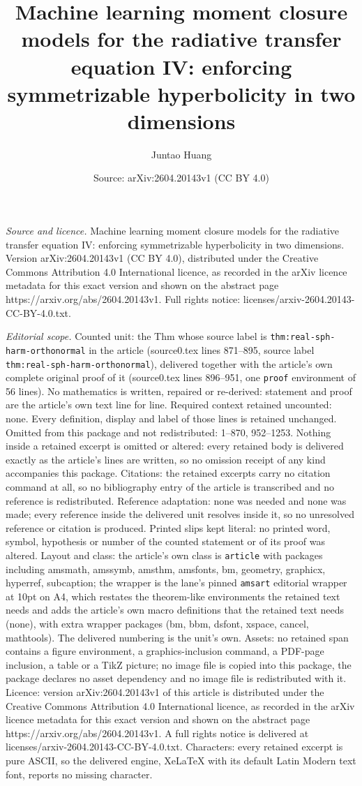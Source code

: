 \documentclass[10pt,a4paper]{amsart}
\title[Machine learning moment closure models for the radiative tra]{Machine learning moment closure models for the radiative transfer equation IV: enforcing symmetrizable hyperbolicity in two dimensions}
\author{Juntao Huang}
\date{Source: arXiv:2604.20143v1 (CC BY 4.0)}
\begin{document}
\maketitle

\noindent\emph{Source and licence.} Machine learning moment closure models for the radiative transfer equation IV: enforcing symmetrizable hyperbolicity in two dimensions. Version arXiv:2604.20143v1 (CC BY 4.0), distributed under the Creative Commons Attribution 4.0 International licence, as recorded in the arXiv licence metadata for this exact version and shown on the abstract page https://arxiv.org/abs/2604.20143v1. Full rights notice: licenses/arxiv-2604.20143-CC-BY-4.0.txt.\par\smallskip

\noindent\textit{Editorial scope.} Counted unit: the Thm whose source label is \texttt{thm:real-sph-harm-orthonormal} in the article (source0.tex lines 871--895, source label \texttt{thm:real-sph-harm-orthonormal}), delivered together with the article's own complete original proof of it (source0.tex lines 896--951, one \texttt{proof} environment of 56 lines). No mathematics is written, repaired or re-derived: statement and proof are the article's own text line for line. Required context retained uncounted: none. Every definition, display and label of those lines is retained unchanged. Omitted from this package and not redistributed: 1--870, 952--1253. Nothing inside a retained excerpt is omitted or altered: every retained body is delivered exactly as the article's lines are written, so no omission receipt of any kind accompanies this package. Citations: the retained excerpts carry no citation command at all, so no bibliography entry of the article is transcribed and no reference is redistributed. Reference adaptation: none was needed and none was made; every reference inside the delivered unit resolves inside it, so no unresolved reference or citation is produced. Printed slips kept literal: no printed word, symbol, hypothesis or number of the counted statement or of its proof was altered. Layout and class: the article's own class is \texttt{article} with packages including amsmath, amssymb, amsthm, amsfonts, bm, geometry, graphicx, hyperref, subcaption; the wrapper is the lane's pinned \texttt{amsart} editorial wrapper at 10pt on A4, which restates the theorem-like environments the retained text needs and adds the article's own macro definitions that the retained text needs (none), with extra wrapper packages (bm, bbm, dsfont, xspace, cancel, mathtools). The delivered numbering is the unit's own. Assets: no retained span contains a figure environment, a graphics-inclusion command, a PDF-page inclusion, a table or a TikZ picture; no image file is copied into this package, the package declares no asset dependency and no image file is redistributed with it. Licence: version arXiv:2604.20143v1 of this article is distributed under the Creative Commons Attribution 4.0 International licence, as recorded in the arXiv licence metadata for this exact version and shown on the abstract page https://arxiv.org/abs/2604.20143v1. A full rights notice is delivered at licenses/arxiv-2604.20143-CC-BY-4.0.txt. Characters: every retained excerpt is pure ASCII, so the delivered engine, XeLaTeX with its default Latin Modern text font, reports no missing character.
\end{document}
